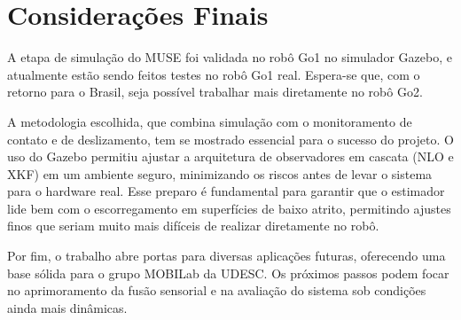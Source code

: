 \chapter{Considerações Finais}


A etapa de simulação do MUSE foi validada no robô Go1 no simulador Gazebo, e atualmente estão sendo feitos testes no robô Go1 real. Espera-se que, com o retorno para o Brasil, seja possível trabalhar mais diretamente no robô Go2.

A metodologia escolhida, que combina simulação com o monitoramento de contato e de deslizamento, tem se mostrado essencial para o sucesso do projeto. O uso do Gazebo permitiu ajustar a arquitetura de observadores em cascata (NLO e XKF) em um ambiente seguro, minimizando os riscos antes de levar o sistema para o hardware real. Esse preparo é fundamental para garantir que o estimador lide bem com o escorregamento em superfícies de baixo atrito, permitindo ajustes finos que seriam muito mais difíceis de realizar diretamente no robô.

Por fim, o trabalho abre portas para diversas aplicações futuras, oferecendo uma base sólida para o grupo MOBILab da UDESC. Os próximos passos podem focar no aprimoramento da fusão sensorial e na avaliação do sistema sob condições ainda mais dinâmicas.




